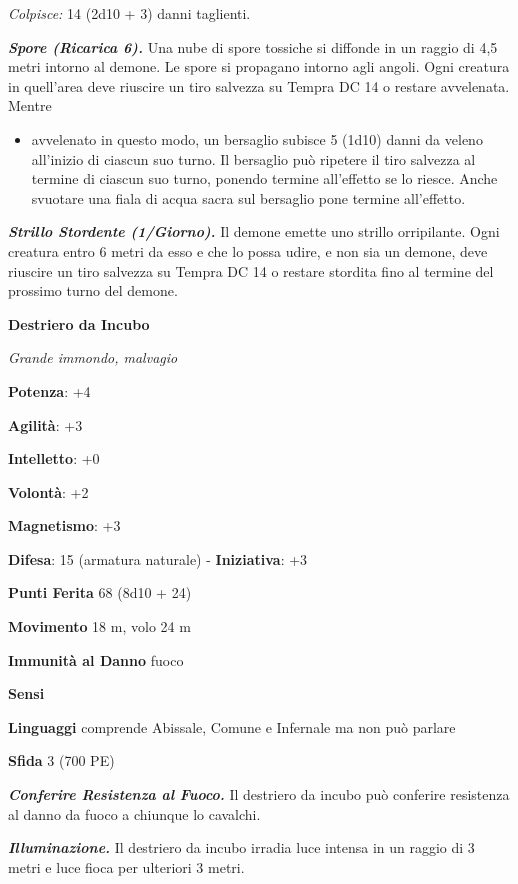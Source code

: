 \begin{multicols}{2}
\emph{Colpisce:} 14 (2d10 + 3) danni taglienti.

\emph{\textbf{Spore (Ricarica 6).}} Una nube di spore tossiche si
diffonde in un raggio di 4,5 metri intorno al demone. Le spore si
propagano intorno agli angoli. Ogni creatura in quell'area deve riuscire
un tiro salvezza su Tempra DC 14 o restare avvelenata. Mentre


\begin{itemize}
\item
  avvelenato in questo modo, un bersaglio subisce 5 (1d10) danni da
  veleno all'inizio di ciascun suo turno. Il bersaglio può ripetere il
  tiro salvezza al termine di ciascun suo turno, ponendo termine
  all'effetto se lo riesce. Anche svuotare una fiala di acqua sacra sul
  bersaglio pone termine all'effetto.
\end{itemize}


\emph{\textbf{Strillo Stordente (1/Giorno).}} Il demone emette uno
strillo orripilante. Ogni creatura entro 6 metri da esso e che lo possa
udire, e non sia un demone, deve riuscire un tiro salvezza su Tempra DC 14 o restare stordita fino al termine del prossimo turno
del demone.


\textbf{Destriero da Incubo}

\emph{Grande immondo, malvagio}

\textbf{Potenza}: +4

\textbf{Agilità}: +3

\textbf{Intelletto}: +0

\textbf{Volontà}: +2

\textbf{Magnetismo}: +3

\textbf{Difesa}: 15 (armatura naturale) - \textbf{Iniziativa}: +3

\textbf{Punti Ferita} 68 (8d10 + 24)

\textbf{Movimento} 18 m, volo 24 m

\textbf{Immunità al Danno} fuoco

\textbf{Sensi} 

\textbf{Linguaggi} comprende Abissale, Comune e Infernale ma non può
parlare

\textbf{Sfida} 3 (700 PE)

\emph{\textbf{Conferire Resistenza al Fuoco.}} Il destriero da incubo
può conferire resistenza al danno da fuoco a chiunque lo cavalchi.

\emph{\textbf{Illuminazione.}} Il destriero da incubo irradia luce
intensa in un raggio di 3 metri e luce fioca per ulteriori 3 metri.


\end{multicols}
